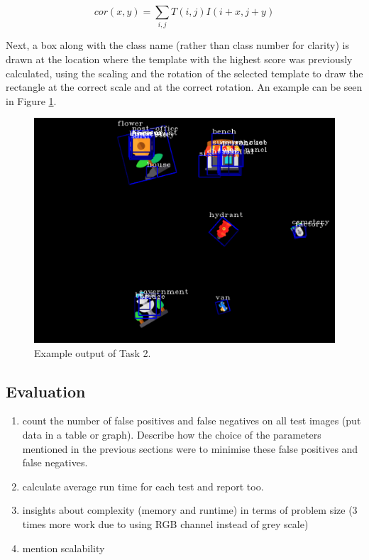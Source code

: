 \documentclass[a4paper,11pt,twocolumn]{article}
\begin{document}
\begin{equation}
\label{eq:corr}
    cor(x,y) = \sum_{i,j} T(i,j) I(i+x, j+y)
\end{equation}

Next, a box along with the class name (rather than class number for clarity) is drawn at the location where the template with the highest score was previously calculated, using the scaling and the rotation of the selected template to draw the rectangle at the correct scale and at the correct rotation. An example can be seen in Figure \ref{fig:template-matching-output-example}.\\

\begin{figure}[!htbp]
\centering
\includegraphics[scale=0.25]{figures/template-matching-output-example.png}
\caption{Example output of Task 2.}
\label{fig:template-matching-output-example} 
\end{figure}

\subsection{Evaluation}

\begin{enumerate}
    \item count the number of false positives and false negatives on all test images (put data in a table or graph). Describe how the choice of the parameters mentioned in the previous sections were to minimise these false positives and false negatives.
    \item calculate average run time for each test and report too.
    \item insights about complexity (memory and runtime) in terms of problem size (3 times more work due to using RGB channel instead of grey scale)
    \item mention scalability
\end{enumerate}
\end{document}
